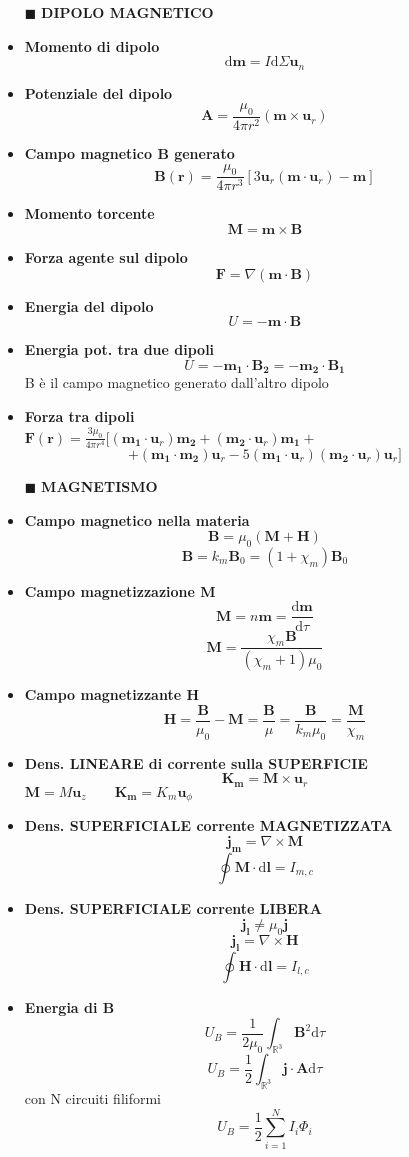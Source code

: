 \documentclass{book}
\newcommand{\g}{\textbf}
\newcommand{\h}{\mathbf}
\newcommand{\e}{\begin{equation}}
\newcommand{\ex}{\end{equation} }
\renewcommand{\it}{\item[$\cdot$]}
\begin{document}
\begin{multicols}{4}
\begin{itemize}
\hline
\item [$\blacksquare$] \g{DIPOLO MAGNETICO}
    \it \g{Momento di dipolo}
        \e{\mathrm{d}\h{m}=I\mathrm{d}\Sigma\h{u}_n} \ex
    \it \g{Potenziale del dipolo}
        \e{\h{A}=\frac{\mu_0}{4\pi r^2}(\h{m}\times\h{u}_r)}\ex
    \it \g{Campo magnetico B generato}
        \e{\h{B}(\h{r})=\frac{\mu_0}{4\pi r^3}[3\h{u}_r(\h{m}\cdot\h{u}_r)-\h{m}]}\ex
    \it \g{Momento torcente}
        \e{\h{M}=\h{m}\times\h{B}} \ex
    \it \g{Forza agente sul dipolo}
        \e{\h{F}=\nabla(\h{m}\cdot\h{B})} \ex
    \it \g{Energia del dipolo}
        \e{U=-\h{m}\cdot\h{B}} \ex
    \it \g{Energia pot. tra due dipoli}
        \e{U=-\h{m_1}\cdot\h{B_2}=-\h{m_2}\cdot\h{B_1}} \ex
        B è il campo magnetico generato dall'altro dipolo 
    \it \g{Forza tra dipoli} \\
        $\h{F}(\h{r})=\frac{3\mu_0}{4\pi r^4}[(\h{m_1}\cdot\h{u}_r)\h{m_2}+(\h{m_2}\cdot\h{u}_r)\h{m_1}+$
        \e{+(\h{m_1}\cdot\h{m_2})\h{u}_r-5(\h{m_1}\cdot\h{u}_r)(\h{m_2}\cdot\h{u}_r)\h{u}_r]}\ex

\hline
\item [$\blacksquare$] \g{MAGNETISMO}
    \it \g{Campo magnetico nella materia}
        \e{\h{B}=\mu_0(\h{M}+\h{H})} \ex
        \e{\h{B}=k_m\h{B}_0=(1+\chi_m)\h{B}_0} \ex
    \it \g{Campo magnetizzazione M}
        \e{\h{M}=n\h{m}=\frac{\mathrm{d}\h{m}}{\mathrm{d}\tau}} \ex
        \e{\h{M}=\frac{\chi_m \h{B}}{(\chi_m+1)\mu_0}} \ex
    \it \g{Campo magnetizzante H}
        \e{\h{H}=\frac{\h{B}}{\mu_0}-\h{M}=\frac{\h{B}}{\mu}=\frac{\h{B}}{k_m\mu_0}=\frac{\h{M}}{\chi_m}} \ex
    \it \g{Dens. LINEARE di corrente sulla SUPERFICIE}
        \e{\h{K_m}=\h{M}\times\h{u}_r} \ex
        $\h{M}=M\h{u}_z \qquad \h{K_m}=K_m\h{u}_\phi$ \\
    \it \g{Dens. SUPERFICIALE corrente MAGNETIZZATA}
        \e{\h{j_m}=\nabla\times\h{M}} \ex
        \e{\oint\h{M}\cdot\mathrm{d}\h{{l}}=I_{m,c}} \ex
    \it \g{Dens. SUPERFICIALE corrente LIBERA}
        \e{\h{j_l}\neq\mu_0\h{j}} \ex
        \e{\h{j_l}=\nabla\times\h{H}} \ex
        \e{\oint\h{H}\cdot\mathrm{d}\h{l}=I_{l,c}} \ex
    \it \g{Energia di B}
        \e{ U_B=\frac{1}{2 \mu_{0}} \int_{\mathbb{R}^3} \h{B}^{2} \mathrm{d}\tau }\ex
        \e{U_B=\frac{1}{2}\int_{\mathbb{R}^3}\h{j}\cdot\h{A}\mathrm{d}\tau} \ex
        con N circuiti filiformi
        \e{U_B=\frac{1}{2}\sum_{i=1}^N I_i\Phi_i} \ex


\end{itemize}
\end{multicols}
\end{document}
